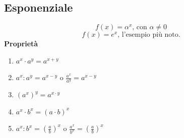\documentclass{book}
\begin{document}
\begin{definition}
    \subsection{Esponenziale}
    \[f(x) = \alpha^x\text{, con } \alpha \neq 0\]
    \[f(x) = e^x\text{, l'esempio più noto.}\]
    \textbf{Proprietà}
    \begin{enumerate}
        \item \(a^x \cdot a^y = a^{x+y}\)
        \item \(a^x : a^y = a^{x-y}\) o \( \frac{a^x}{a^y} = a^{x-y} \)
        \item \((a^x)^y = a^{x \cdot y}\)
        \item \(a^x \cdot b^x = (a \cdot b)^x\)
        \item \(a^x : b^x = \left( \frac{a}{b} \right)^x\) o \( \frac{a^x}{b^x} = \left( \frac{a}{b} \right)^x \)
    \end{enumerate}
\end{definition}
\end{document}
